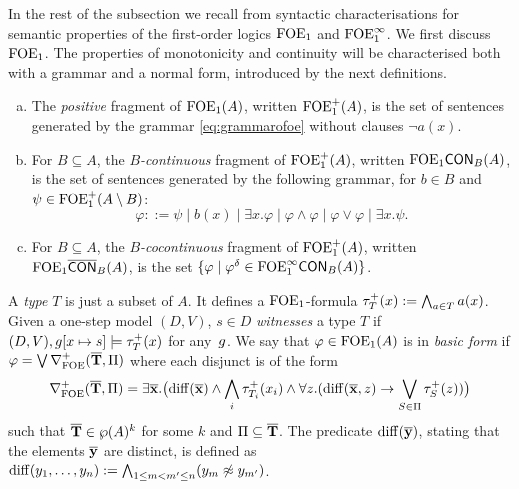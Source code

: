 
In the rest of the subsection we recall from \cite{CFVZ-ModelTheoryPaper} syntactic characterisations for semantic properties of the first-order logics $\mathrm{FOE}_1$ and $\mathrm{FOE}^{\infty}_1$. We first discuss $\mathrm{FOE}_1$. The properties of monotonicity and continuity will be characterised both with a grammar and a normal form, introduced by the next definitions.

\begin{definition}
\begin{enumerate}[(a)]
\item The \emph{positive} fragment of $\mathrm{FOE}_1(A)$, written $\mathrm{FOE}_1^{+}(A)$, is the set of sentences generated by the grammar \eqref{eq:grammarofoe} without clauses $\lnot a(x)$. 
\item For $B \subseteq A$, the \emph{$B$-continuous} fragment of $\mathrm{FOE}_1^{+}(A)$, written $\mathrm{FOE}_1\mathsf{CON}_{B}(A)$, is the set of sentences generated by the following grammar, for $b \in B$ and $\psi \in \mathrm{FOE}_1^{+}(A \setminus B)$:
\[
\varphi ::= \psi \mid b(x) \mid \exists x.\varphi \mid \varphi \land \varphi \mid \varphi \lor \varphi \mid \exists x. \psi.
\]
\item For $B \subseteq A$, the \emph{$B$-cocontinuous} fragment of $\mathrm{FOE}_1^{+}(A)$, written $\mathrm{FOE}_1\overline{\mathsf{CON}}_{B}(A)$, is the set $\{\varphi \mid \varphi^\delta \in \mathrm{FOE}^{\infty}_1\mathsf{CON}_{B}(A)\}$.
\end{enumerate}
\end{definition}

\begin{definition}%
\label{def:basicform-ofoe}
A \emph{type} $T$ is just a subset of $A$. It defines a $\mathrm{FOE}_1$-formula $\tau^{+}_T(x) \mathrel{: =} \bigwedge_{a \in T} a(x)$. Given a one-step model $(D,V)$, $s \in D$ \emph{witnesses} a type $T$ if $(D,V), g[x\mapsto s] \models \tau^{+}_T(x)$ for any~$g$. We say that $\varphi \in \mathrm{FOE}_1(A)$ is in \emph{basic form} if $\varphi = \bigvee \nabla^+_{\mathrm{FOE}}(\overline{{\mathbf{T}}},\Pi)$ where each disjunct is of the form
%
\begin{equation*}%
\posdbnfofoe{\vlist{T}}{\Pi} = \exists \vlist{x}.\big(\arediff{\vlist{x}} \land \bigwedge_i \tau^{+}_{T_i}(x_i) \land \forall z.(\arediff{\vlist{x},z} \lthen \bigvee_{S\in \Pi} \tau^{+}_S(z))\big)
\end{equation*}
%
such that $\overline{{\mathbf{T}}} \in \wp(A)^k$ for some $k$ and $\Pi \subseteq \overline{{\mathbf{T}}}$.  The predicate $\mathrm{diff}(\overline{{\mathbf{y}}})$, stating that the elements $\overline{{\mathbf{y}}}$ are distinct, is defined as $\mathrm{diff}(y_1,\dots,y_n) := \bigwedge_{1\leq m < m^{\prime} \leq n} (y_m \not\approx y_{m^{\prime}})$.
\end{definition}

